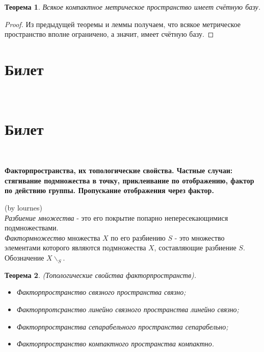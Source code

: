 \documentclass[a4paper,100pt]{article}
\theoremstyle{indented}
\newtheorem{theorem}{Теорема}
\begin{document}
     \begin{theorem}
         Всякое компактное метрическое пространство имеет счётную базу.
     \end{theorem}
     
     \begin{proof}
         Из предыдущей теоремы и леммы получаем, что всякое метрическое пространство вполне ограничено, а значит, имеет счётную базу.
     \end{proof}

\section{Билет} \

\medskip

\section{Билет} \

\medskip

\textbf{Факторпространства, их топологические свойства. Частные случаи: стягивание подмножества в точку, приклеивание по отображению, фактор по действию группы. Пропускание отображения через фактор.}

        (by lournes)\\

\textit{Разбиение множества} - это его покрытие попарно непересекающимися подмножествами.\\

\textit{Фактормножество} множества $X$ по его разбиению $S$ - это множество элементами которого являются подмножества $X$, составляющие разбиение $S$. Обозначение $X\backslash _S$.\\

\begin{theorem}
    (Топологические свойства факторпространств).
    \begin{itemize}
        \item Факторпространство связного пространства связно;
        \item Факторпротсранство линейно связного пространства линейно связно;
        \item Факторпространства сепарабельного пространства сепарабельно;
        \item Факторпространство компактного пространства компактно.
    \end{itemize}
\end{theorem}
\end{document}
